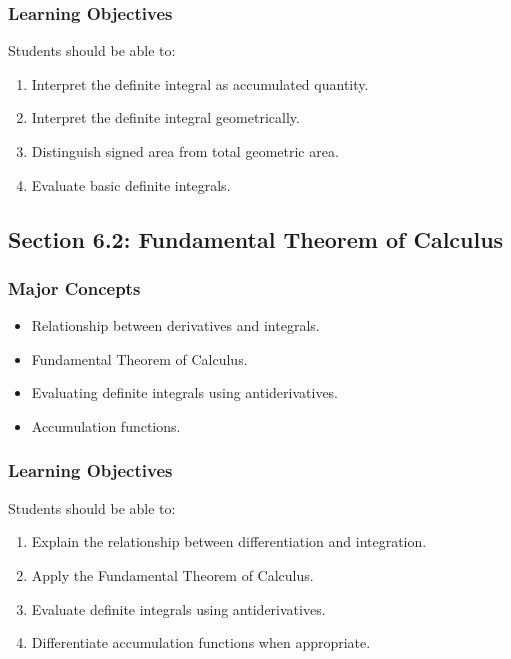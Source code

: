 \documentclass[11pt]{article}
\begin{document}
\subsubsection{Learning Objectives}

Students should be able to:

\begin{enumerate}
    \item Interpret the definite integral as accumulated quantity.
    \item Interpret the definite integral geometrically.
    \item Distinguish signed area from total geometric area.
    \item Evaluate basic definite integrals.
\end{enumerate}

\subsection{Section 6.2: Fundamental Theorem of Calculus}

\subsubsection{Major Concepts}

\begin{itemize}
    \item Relationship between derivatives and integrals.
    \item Fundamental Theorem of Calculus.
    \item Evaluating definite integrals using antiderivatives.
    \item Accumulation functions.
\end{itemize}

\subsubsection{Learning Objectives}

Students should be able to:

\begin{enumerate}
    \item Explain the relationship between differentiation and integration.
    \item Apply the Fundamental Theorem of Calculus.
    \item Evaluate definite integrals using antiderivatives.
    \item Differentiate accumulation functions when appropriate.
\end{enumerate}
\end{document}

